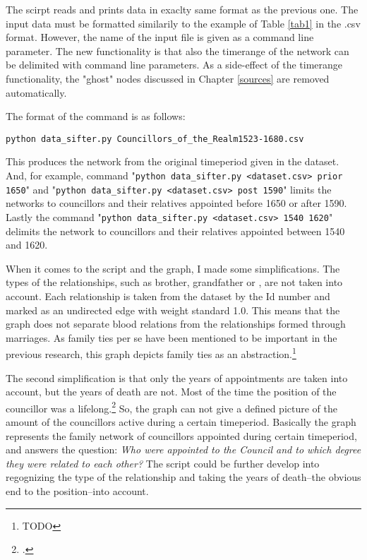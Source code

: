 The scirpt reads and prints data in exaclty same format as the previous one. The input data must be formatted similarily to the example of Table \ref{tab1} in the .csv format. However, the name of the input file is given as a command line parameter. The new functionality is that also the timerange of the network can be delimited with command line parameters. As a side-effect of the timerange functionality, the "ghost" nodes discussed in Chapter \ref{sources} are removed automatically.

The format of the command is as follows: 
\begin{verbatim}
python data_sifter.py Councillors_of_the_Realm1523-1680.csv
\end{verbatim}

This produces the network from the original timeperiod given in the dataset. And, for example, command "\texttt{python data\_sifter.py <dataset.csv> prior 1650}" and "\texttt{python data\_sifter.py <dataset.csv> post 1590}" limits the networks to councillors and their relatives appointed before 1650 or after 1590. Lastly the command "\texttt{python data\_sifter.py <dataset.csv> 1540 1620}" delimits the network to councillors and their relatives appointed between 1540 and 1620.

When it comes to the script and the graph, I made some simplifications. The types of the relationships, such as brother, grandfather or , are not taken into account. Each relationship is taken from the dataset by the Id number and marked as an undirected edge with weight standard 1.0. This means that the graph does not separate blood relations from the relationships formed through marriages. As family ties per se have been mentioned to be important in the previous research, this graph depicts family ties as an abstraction.\footnote{TODO} 

The second simplification is that only the years of appointments are taken into account, but the years of death are not. Most of the time the position of the councillor was a lifelong.\footcite[TODO]{HakanenAKoskinen2017} So, the graph can not give a defined picture of the amount of the councillors active during a certain timeperiod. Basically the graph represents the family network of councillors appointed during certain timeperiod, and answers the question: \textit{Who were appointed to the Council and to which degree they were related to each other?} The script could be further develop into regognizing the type of the relationship and taking the years of death–the obvious end to the position–into account.


